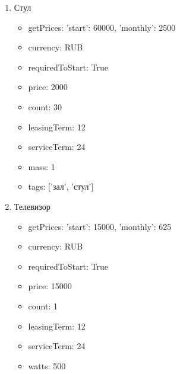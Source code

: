 \documentclass[a4paper,12pt]{article}
\begin{document}
\begin{enumerate}
\begin{itemize}
        \end{itemize}
      
      \item Стул
        \begin{itemize}
        
          \item getPrices: {'start': 60000, 'monthly': 2500}
        
          \item currency: RUB
        
          \item requiredToStart: True
        
          \item price: 2000
        
          \item count: 30
        
          \item leasingTerm: 12
        
          \item serviceTerm: 24
        
          \item mass: 1
        
          \item tags: ['зал', 'стул']
        
        \end{itemize}
      
      \item Телевизор
        \begin{itemize}
        
          \item getPrices: {'start': 15000, 'monthly': 625}
        
          \item currency: RUB
        
          \item requiredToStart: True
        
          \item price: 15000
        
          \item count: 1
        
          \item leasingTerm: 12
        
          \item serviceTerm: 24
        
          \item watts: 500
        

\end{itemize}
\end{enumerate}
\end{document}
